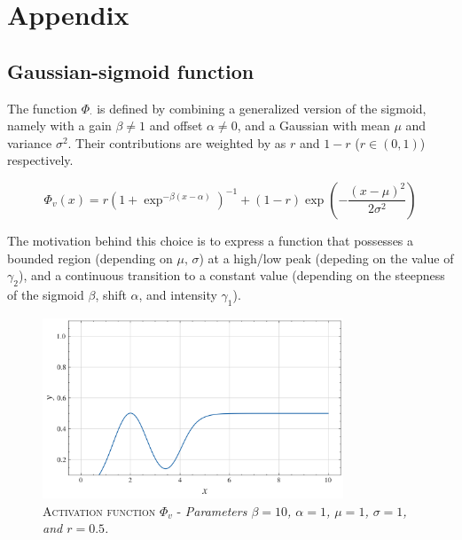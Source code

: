 
\section{Appendix}\label{sec:appendix}


\subsection{Gaussian-sigmoid function}
\noindent The function $\Phi_{\cdot}$ is defined by combining a generalized version of the sigmoid, namely with a gain $\beta \neq 1$ and offset $\alpha\neq 0$, and a Gaussian with mean $\mu$ and variance $\sigma^{2}$. Their contributions are weighted by as $r$ and $1-r$ ($r\in(0,1)$) respectively.

\begin{equation*}
    \Phi_v(x) = r\left(1 + \exp^{-\beta(x-\alpha)}\right)^{-1} + (1-r)\exp\left(-\frac{(x-\mu)^2}{2\sigma^2}\right)
\end{equation*}

\noindent The motivation behind this choice is to express a function that possesses a bounded region (depending on $\mu,\,\sigma$) at a high/low peak (depeding on the value of $\gamma_{2}$), and a continuous transition to a constant value (depending on the steepness of the sigmoid $\beta$, shift
$\alpha$, and intensity $\gamma_{1}$).

\begin{figure}[ht]
    \centering
    \includegraphics[width=0.8\textwidth]{figures/gaussian_sigmoid.png}
    \caption{\textsc{Activation function $\Phi_{v}$} - \textit{Parameters $\beta=10$, $\alpha=1$, $\mu=1$, $\sigma=1$, and $r=0.5$.}}
    \label{fig:gau_sigm}
\end{figure}


